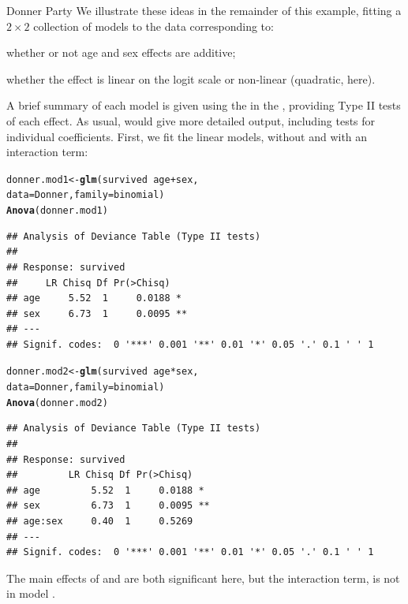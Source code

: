 \documentclass[11pt]{book}\usepackage[]{graphicx}\usepackage[]{color}
\makeatletter
\newcommand{\hlopt}[1]{\textcolor[rgb]{0,0,0}{#1}}%
\newcommand{\hlstd}[1]{\textcolor[rgb]{0.345,0.345,0.345}{#1}}%
\newcommand{\hlkwb}[1]{\textcolor[rgb]{0.69,0.353,0.396}{#1}}%
\newcommand{\hlkwc}[1]{\textcolor[rgb]{0.333,0.667,0.333}{#1}}%
\newcommand{\hlkwd}[1]{\textcolor[rgb]{0.737,0.353,0.396}{\textbf{#1}}}%
\newenvironment{kframe}{%
 \def\at@end@of@kframe{}%
 \ifinner\ifhmode%
  \def\at@end@of@kframe{\end{minipage}}%
  \begin{minipage}{\columnwidth}%
 \fi\fi%
 \def\FrameCommand##1{\hskip\@totalleftmargin \hskip-\fboxsep
 \colorbox{shadecolor}{##1}\hskip-\fboxsep
     \hskip-\linewidth \hskip-\@totalleftmargin \hskip\columnwidth}%
 \MakeFramed {\advance\hsize-\width
   \@totalleftmargin\z@ \linewidth\hsize
   \@setminipage}}%
 {\par\unskip\endMakeFramed%
 \at@end@of@kframe}
\newenvironment{knitrout}{}{} %
\renewenvironment{knitrout}{\small\renewcommand{\baselinestretch}{.85}}{} %
\makeatother
\begin{document}
\begin{Example}[donner1]{Donner Party}
We illustrate these ideas in the remainder of this example, fitting a
$2 \times 2$ collection of models to the  data
corresponding to:
\begin{seriate}
 \item whether or not age and sex effects are additive;
 \item whether the effect is linear on the logit scale or non-linear (quadratic, here).
\end{seriate}
A brief summary of each model is given using the  in
the , providing Type II tests of each effect.
As usual,  would give more detailed output, including
tests for individual coefficients.
First, we fit the linear models, without and with an interaction term:
\begin{knitrout}
\color{fgcolor}\begin{kframe}
\begin{alltt}
\hlstd{donner.mod1} \hlkwb{<-} \hlkwd{glm}\hlstd{(survived} \hlopt{~} \hlstd{age} \hlopt{+} \hlstd{sex,}
                   \hlkwc{data}\hlstd{=Donner,} \hlkwc{family}\hlstd{=binomial)}
\hlkwd{Anova}\hlstd{(donner.mod1)}
\end{alltt}
\begin{verbatim}
## Analysis of Deviance Table (Type II tests)
## 
## Response: survived
##     LR Chisq Df Pr(>Chisq)   
## age     5.52  1     0.0188 * 
## sex     6.73  1     0.0095 **
## ---
## Signif. codes:  0 '***' 0.001 '**' 0.01 '*' 0.05 '.' 0.1 ' ' 1
\end{verbatim}
\begin{alltt}
\hlstd{donner.mod2} \hlkwb{<-} \hlkwd{glm}\hlstd{(survived} \hlopt{~} \hlstd{age} \hlopt{*} \hlstd{sex,}
                   \hlkwc{data}\hlstd{=Donner,} \hlkwc{family}\hlstd{=binomial)}
\hlkwd{Anova}\hlstd{(donner.mod2)}
\end{alltt}
\begin{verbatim}
## Analysis of Deviance Table (Type II tests)
## 
## Response: survived
##         LR Chisq Df Pr(>Chisq)   
## age         5.52  1     0.0188 * 
## sex         6.73  1     0.0095 **
## age:sex     0.40  1     0.5269   
## ---
## Signif. codes:  0 '***' 0.001 '**' 0.01 '*' 0.05 '.' 0.1 ' ' 1
\end{verbatim}
\end{kframe}
\end{knitrout}
\noindent The main effects of  and  are both significant here,
but the interaction term,  is not in model .



\end{Example}
\end{document}
